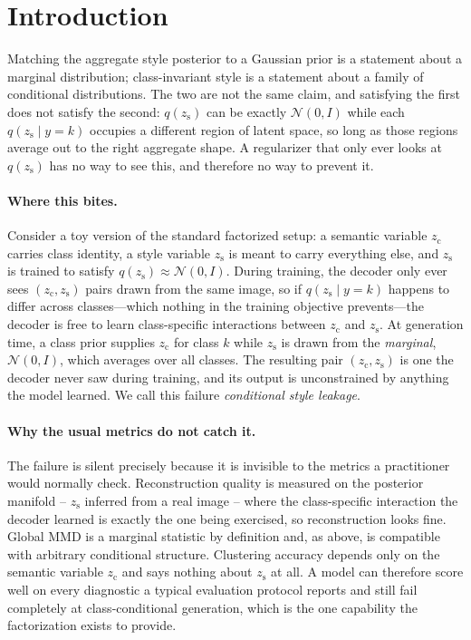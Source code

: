 \documentclass[10pt,letterpaper]{article}
\newcommand{\zc}{z_{\mathrm{c}}}
\newcommand{\zs}{z_{\mathrm{s}}}
\begin{document}
\section{Introduction}
\label{sec:intro}

Matching the aggregate style posterior to a Gaussian prior is a statement
about a marginal distribution; class-invariant style is a statement about a
family of conditional distributions. The two are not the same claim, and
satisfying the first does not satisfy the second: $q(\zs)$ can be exactly
$\mathcal N(0,I)$ while each $q(\zs\mid y{=}k)$ occupies a different region
of latent space, so long as those regions average out to the right
aggregate shape. A regularizer that only ever looks at $q(\zs)$ has no way
to see this, and therefore no way to prevent it.

\paragraph{Where this bites.}
Consider a toy version of the standard factorized setup: a semantic
variable $\zc$ carries class identity, a style variable $\zs$ is meant to
carry everything else, and $\zs$ is trained to satisfy
$q(\zs)\approx\mathcal N(0,I)$. During training, the decoder only ever sees
$(\zc,\zs)$ pairs drawn from the same image, so if $q(\zs\mid y{=}k)$
happens to differ across classes---which nothing in the training objective
prevents---the decoder is free to learn class-specific interactions between
$\zc$ and $\zs$. At generation time, a class prior supplies $\zc$ for class
$k$ while $\zs$ is drawn from the \emph{marginal}, $\mathcal N(0,I)$, which
averages over all classes. The resulting pair $(\zc,\zs)$ is one the decoder
never saw during training, and its output is unconstrained by anything the
model learned. We call this failure \emph{conditional style leakage}.

\paragraph{Why the usual metrics do not catch it.}
The failure is silent precisely because it is invisible to the metrics a
practitioner would normally check. Reconstruction quality is measured on
the posterior manifold -- $\zs$ inferred from a real image -- where the
class-specific interaction the decoder learned is exactly the one being
exercised, so reconstruction looks fine. Global MMD is a marginal statistic
by definition and, as above, is compatible with arbitrary conditional
structure. Clustering accuracy depends only on the semantic variable $\zc$
and says nothing about $\zs$ at all. A model can therefore score well on
every diagnostic a typical evaluation protocol reports and still fail
completely at class-conditional generation, which is the one capability the
factorization exists to provide.
\end{document}
